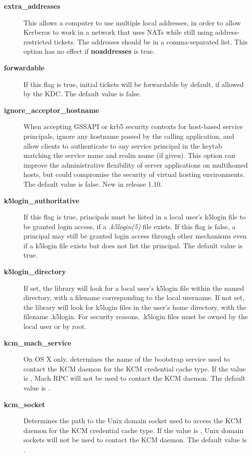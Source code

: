 \documentclass[letterpaper,10pt,english]{sphinxmanual}
\begin{document}
\begin{description}
\item[{\textbf{extra\_addresses}}] \leavevmode
This allows a computer to use multiple local addresses, in order
to allow Kerberos to work in a network that uses NATs while still
using address-restricted tickets.  The addresses should be in a
comma-separated list.  This option has no effect if
\textbf{noaddresses} is true.

\item[{\textbf{forwardable}}] \leavevmode
If this flag is true, initial tickets will be forwardable by
default, if allowed by the KDC.  The default value is false.

\item[{\textbf{ignore\_acceptor\_hostname}}] \leavevmode
When accepting GSSAPI or krb5 security contexts for host-based
service principals, ignore any hostname passed by the calling
application, and allow clients to authenticate to any service
principal in the keytab matching the service name and realm name
(if given).  This option can improve the administrative
flexibility of server applications on multihomed hosts, but could
compromise the security of virtual hosting environments.  The
default value is false.  New in release 1.10.

\item[{\textbf{k5login\_authoritative}}] \leavevmode
If this flag is true, principals must be listed in a local user's
k5login file to be granted login access, if a \emph{.k5login(5)}
file exists.  If this flag is false, a principal may still be
granted login access through other mechanisms even if a k5login
file exists but does not list the principal.  The default value is
true.

\item[{\textbf{k5login\_directory}}] \leavevmode
If set, the library will look for a local user's k5login file
within the named directory, with a filename corresponding to the
local username.  If not set, the library will look for k5login
files in the user's home directory, with the filename .k5login.
For security reasons, .k5login files must be owned by
the local user or by root.

\item[{\textbf{kcm\_mach\_service}}] \leavevmode
On OS X only, determines the name of the bootstrap service used to
contact the KCM daemon for the KCM credential cache type.  If the
value is \code{-}, Mach RPC will not be used to contact the KCM
daemon.  The default value is .

\item[{\textbf{kcm\_socket}}] \leavevmode
Determines the path to the Unix domain socket used to access the
KCM daemon for the KCM credential cache type.  If the value is
\code{-}, Unix domain sockets will not be used to contact the KCM
daemon.  The default value is
.


\end{description}
\end{document}
